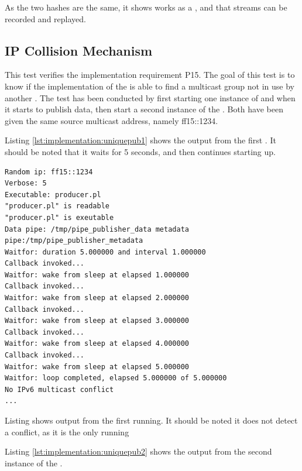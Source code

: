 \noindent{}As the two hashes are the same, it shows  works as a \hist{}, and that streams can be recorded and replayed.


\subsection{IP Collision Mechanism} 
This test verifies the implementation requirement P15. The goal of this test is to know if the implementation of the \pub{} is able to find a multicast group not in use by another \pub{}.
The test has been conducted by first starting one instance of  and when it starts to publish data, then start a second instance of the . Both  have been given the same source multicast address, namely ff15::1234.

Listing \ref{lst:implementation:uniquepub1} shows the output from the first . It should be noted that it waits for 5 seconds, and then continues starting up.

\begin{listing}[H] 
\begin{verbatim}
Random ip: ff15::1234
Verbose: 5
Executable: producer.pl
"producer.pl" is readable
"producer.pl" is exeutable
Data pipe: /tmp/pipe_publisher_data metadata pipe:/tmp/pipe_publisher_metadata
Waitfor: duration 5.000000 and interval 1.000000
Callback invoked...
Waitfor: wake from sleep at elapsed 1.000000
Callback invoked...
Waitfor: wake from sleep at elapsed 2.000000
Callback invoked...
Waitfor: wake from sleep at elapsed 3.000000
Callback invoked...
Waitfor: wake from sleep at elapsed 4.000000
Callback invoked...
Waitfor: wake from sleep at elapsed 5.000000
Waitfor: loop completed, elapsed 5.000000 of 5.000000
No IPv6 multicast conflict
...
\end{verbatim}
\caption{Listing shows output from the first \pub{} running. It should be noted it does not detect a conflict, as it is the only \pub{} running}
\label{lst:verify:uniquepub1}
\end{listing}

Listing \ref{lst:implementation:uniquepub2} shows the output from the second instance of the .

